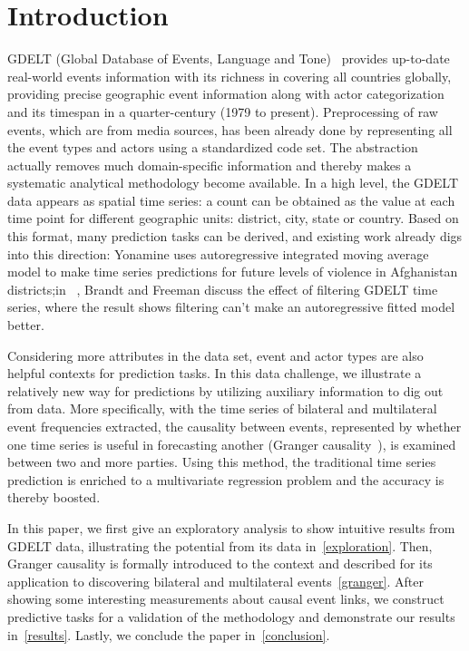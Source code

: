 \documentclass[runningheads,a4paper]{llncs}
\begin{document}
\section{Introduction}
\label{intro}

GDELT (Global Database of Events, Language and Tone)~\cite{gdelt} provides up-to-date real-world events information with its richness in covering all countries globally, providing precise geographic event information along with actor categorization and its timespan in a quarter-century (1979 to present). Preprocessing of raw events, which are from media sources, has been already done by representing all the event types and actors using a standardized code set. The abstraction actually removes much domain-specific information and thereby makes a systematic analytical methodology become available. In a high level, the GDELT data appears as spatial time series: a count can be obtained as the value at each time point for different geographic units: district, city, state or country. Based on this format, many prediction tasks can be derived, and existing work already digs into this direction: Yonamine \cite{yonamine2013} uses autoregressive integrated moving average model to make time series predictions for future levels of violence in Afghanistan districts;in ~\cite{brandt2013}, Brandt and Freeman discuss the effect of filtering GDELT time series, where the result shows filtering can't make an autoregressive fitted model better.  

Considering more attributes in the data set, event and actor types are also helpful contexts for prediction tasks. In this data challenge, we illustrate a relatively new way for predictions by utilizing auxiliary information to dig out from data. More specifically, with the time series of bilateral and multilateral event frequencies extracted, the causality between events, represented by whether one time series is useful in forecasting another (Granger causality~\cite{granger1969}), is examined between two and more parties. Using this method, the traditional time series prediction is enriched to a multivariate regression problem and the accuracy is thereby boosted.
 
In this paper, we first give an exploratory analysis to show intuitive results from GDELT data, illustrating the potential from its data in~\ref{exploration}. Then, Granger causality is formally introduced to the context and described for its application to discovering bilateral and multilateral events~\ref{granger}. After showing some interesting measurements about causal event links, we construct predictive tasks for a validation of the methodology and demonstrate our results in~\ref{results}. Lastly, we conclude the paper in~\ref{conclusion}.
\end{document}
